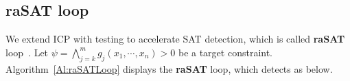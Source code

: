 \documentclass[runningheads,a4paper,oribibl]{llncs}
\begin{document}

\subsection{raSAT loop}

We extend ICP with testing to accelerate SAT detection, which is called {\bf raSAT}
loop~\cite{VanKhanh201227}.  %
Let $\psi = \bigwedge\limits_{j=k}^mg_j(x_1, \cdots, x_n) > 0$ be a target constraint. 
Algorithm~\ref{Al:raSATLoop} displays the {\bf raSAT} loop, which detects as below. 

\end{document}
